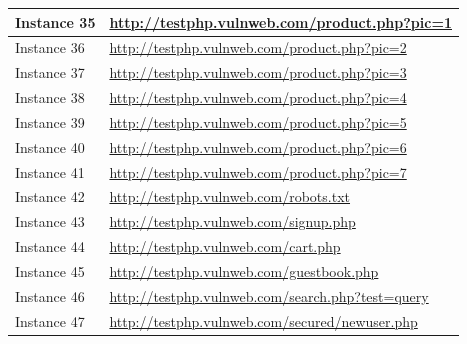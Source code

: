 \documentclass[12pt]{article}
\begin{document}
\begin{center}
\begin{longtable}{|l|p{10cm}|}
\hline
Instance 35 & \url{http://testphp.vulnweb.com/product.php?pic=1} \\
\hline
Instance 36 & \url{http://testphp.vulnweb.com/product.php?pic=2} \\
\hline
Instance 37 & \url{http://testphp.vulnweb.com/product.php?pic=3} \\
\hline
Instance 38 & \url{http://testphp.vulnweb.com/product.php?pic=4} \\
\hline
Instance 39 & \url{http://testphp.vulnweb.com/product.php?pic=5} \\
\hline
Instance 40 & \url{http://testphp.vulnweb.com/product.php?pic=6} \\
\hline
Instance 41 & \url{http://testphp.vulnweb.com/product.php?pic=7} \\
\hline
Instance 42 & \url{http://testphp.vulnweb.com/robots.txt} \\
\hline
Instance 43 & \url{http://testphp.vulnweb.com/signup.php} \\
\hline
Instance 44 & \url{http://testphp.vulnweb.com/cart.php} \\
\hline
Instance 45 & \url{http://testphp.vulnweb.com/guestbook.php} \\
\hline
Instance 46 & \url{http://testphp.vulnweb.com/search.php?test=query} \\
\hline
Instance 47 & \url{http://testphp.vulnweb.com/secured/newuser.php} \\
\hline
\end{longtable}
\end{center}\vspace{0.7cm}
\end{document}
